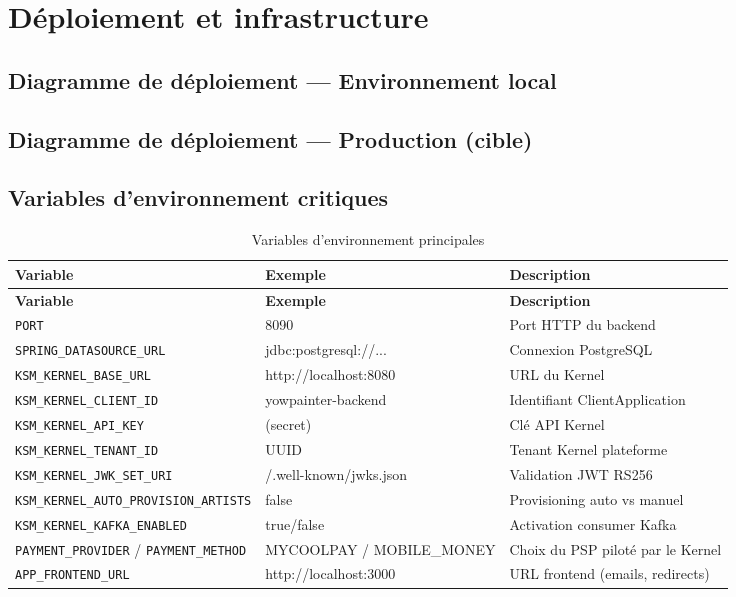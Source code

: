 \chapter{Déploiement et infrastructure}

\section{Diagramme de déploiement — Environnement local}


\section{Diagramme de déploiement — Production (cible)}


\section{Variables d'environnement critiques}

\begin{longtable}{@{}llp{6.5cm}@{}}
  \caption{Variables d'environnement principales} \label{tab:env} \\
  \toprule
  \textbf{Variable} & \textbf{Exemple} & \textbf{Description} \\
  \midrule
  \endfirsthead
  \toprule
  \textbf{Variable} & \textbf{Exemple} & \textbf{Description} \\
  \midrule
  \endhead
  \texttt{PORT} & 8090 & Port HTTP du backend \\
  \texttt{SPRING\_DATASOURCE\_URL} & jdbc:postgresql://... & Connexion PostgreSQL \\
  \texttt{KSM\_KERNEL\_BASE\_URL} & http://localhost:8080 & URL du Kernel \\
  \texttt{KSM\_KERNEL\_CLIENT\_ID} & yowpainter-backend & Identifiant ClientApplication \\
  \texttt{KSM\_KERNEL\_API\_KEY} & (secret) & Clé API Kernel \\
  \texttt{KSM\_KERNEL\_TENANT\_ID} & UUID & Tenant Kernel plateforme \\
  \texttt{KSM\_KERNEL\_JWK\_SET\_URI} & /.well-known/jwks.json & Validation JWT RS256 \\
  \texttt{KSM\_KERNEL\_AUTO\_PROVISION\_ARTISTS} & false & Provisioning auto vs manuel \\
  \texttt{KSM\_KERNEL\_KAFKA\_ENABLED} & true/false & Activation consumer Kafka \\
  \texttt{PAYMENT\_PROVIDER} / \texttt{PAYMENT\_METHOD} & MYCOOLPAY / MOBILE\_MONEY & Choix du PSP piloté par le Kernel \\
  \texttt{APP\_FRONTEND\_URL} & http://localhost:3000 & URL frontend (emails, redirects) \\
  \bottomrule
\end{longtable}


